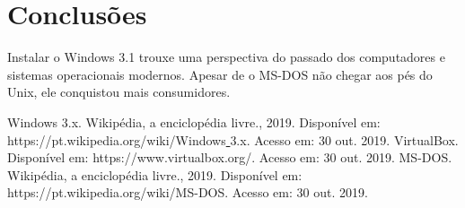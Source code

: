\documentclass{report}
\begin{document}
\chapter{Conclusões}

Instalar o Windows 3.1 trouxe uma perspectiva do passado dos computadores e sistemas operacionais modernos. Apesar de o MS-DOS não chegar aos pés do Unix, ele conquistou mais consumidores.

\begin{thebibliography}{9}
Windows 3.x. Wikipédia, a enciclopédia livre., 2019. Disponível em: https://pt.wikipedia.org/wiki/Windows\underline{ }3.x. Acesso em: 30 out. 2019.
VirtualBox. Disponível em: https://www.virtualbox.org/. Acesso em: 30 out. 2019.
MS-DOS. Wikipédia, a enciclopédia livre., 2019. Disponível em: https://pt.wikipedia.org/wiki/MS-DOS. Acesso em: 30 out. 2019.
\end{thebibliography}
\end{document}
